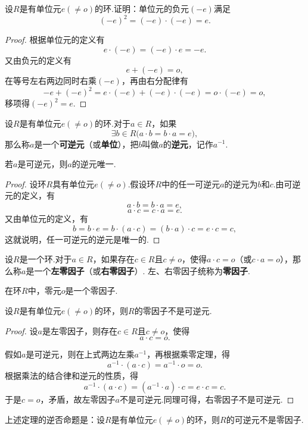 \begin{example}
设\(R\)是有单位元\(e(\neq o)\)的环.证明：单位元的负元\((-e)\)满足\[
(-e)^2=(-e)\cdot(-e)=e.
\]
\begin{proof}
根据单位元的定义有\[
e \cdot (-e) = (-e) \cdot e = -e.
\]又由负元的定义有\[
e + (-e) = o,
\]在等号左右两边同时右乘\((-e)\)，再由右分配律有\[
-e + (-e)^2 = e \cdot (-e) + (-e) \cdot (-e) = o \cdot (-e) = o,
\]移项得\((-e)^2 = e\).
\end{proof}
\end{example}

\begin{definition}
设\(R\)是有单位元\(e(\neq o)\)的环.对于\(a \in R\)，如果\[
\exists b \in R \bigl( a \cdot b = b \cdot a = e \bigr),
\]那么称\(a\)是一个\textbf{可逆元}（或\textbf{单位}），把\(b\)叫做\(a\)的\textbf{逆元}，记作\(a^{-1}\).
\end{definition}

\begin{property}
若\(a\)是可逆元，则\(a\)的逆元唯一.
\begin{proof}
设环\(R\)具有单位元\(e(\neq o)\).假设环\(R\)中的任一可逆元\(a\)的逆元为\(b\)和\(c\).由可逆元的定义，有\[
a \cdot b = b \cdot a = e,
\]\[
a \cdot c = c \cdot a = e.
\]又由单位元的定义，有\[
b = b \cdot e
= b \cdot (a \cdot c)
= (b \cdot a) \cdot c
= e \cdot c
= c,
\]这就说明，任一可逆元的逆元是唯一的.
\end{proof}
\end{property}

\begin{definition}
设\(R\)是一个环.对于\(a \in R\)，如果存在\(c \in R\)且\(c \neq o\)，使得\(a \cdot c = o\)（或\(c \cdot a = o\)），那么称\(a\)是一个\textbf{左零因子}（或\textbf{右零因子}）.
左、右零因子统称为\textbf{零因子}.
\end{definition}

\begin{property}
在环\(R\)中，零元\(o\)是一个零因子.
\end{property}

\begin{theorem}
设\(R\)是有单位元\(e(\neq o)\)的环，则\(R\)的零因子不是可逆元.
\begin{proof}
设\(a\)是左零因子，则存在\(c \in R\)且\(c \neq o\)，使得\[
a \cdot c = o.
\]

假如\(a\)是可逆元，则在上式两边左乘\(a^{-1}\)，再根据乘零定理，得\[
a^{-1} \cdot (a \cdot c) = a^{-1} \cdot o = o.
\]根据乘法的结合律和逆元的性质，得\[
a^{-1} \cdot (a \cdot c) = (a^{-1} \cdot a) \cdot c = e \cdot c = c.
\]于是\(c = o\)，矛盾，故左零因子\(a\)不是可逆元.同理可得，右零因子不是可逆元.
\end{proof}
\end{theorem}
上述定理的逆否命题是：设\(R\)是有单位元\(e(\neq o)\)的环，则\(R\)的可逆元不是零因子.

